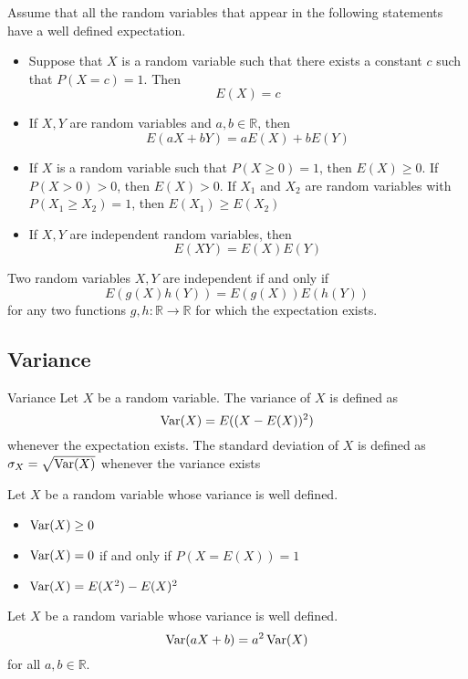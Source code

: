 \documentclass[a4paper]{article}
\begin{document}
\begin{prp}{}{} Assume that all the random variables that appear in the following statements have a well defined expectation. 
\begin{itemize}
\item Suppose that $X$ is a random variable such that there exists a constant $c$ such that $P(X=c)=1$. Then $$E(X)=c$$
\item If $X,Y$ are random variables and $a,b\in\mathbb{R}$, then $$E(aX+bY)=aE(X)+bE(Y)$$
\item If $X$ is a random variable such that $P(X\geq 0)=1$, then $E(X)\geq 0$. If $P(X>0)>0$, then $E(X)>0$. If $X_1$ and $X_2$ are random variables with $P(X_1\geq X_2)=1$, then $E(X_1)\geq E(X_2)$
\item If $X,Y$ are independent random variables, then $$E(XY)=E(X)E(Y)$$
\end{itemize}
\end{prp}

\begin{thm}{}{} Two random variables $X,Y$ are independent if and only if $$E(g(X)h(Y))=E(g(X))E(h(Y))$$ for any two functions $g,h:\mathbb{R}\to\mathbb{R}$ for which the expectation exists. 
\end{thm}

\subsection{Variance}
\begin{defn}{Variance}{} Let $X$ be a random variable. The variance of $X$ is defined as $$\operatorname{Var}(X)=E((X-E(X))^2)$$ whenever the expectation exists. The standard deviation of $X$ is defined as $\sigma_X=\sqrt{\operatorname{Var}(X)}$ whenever the variance exists
\end{defn}

\begin{thm}{}{} Let $X$ be a random variable whose variance is well defined. 
\begin{itemize}
\item $\operatorname{Var}(X)\geq0$
\item $\operatorname{Var}(X)=0$ if and only if $P(X=E(X))=1$
\item $\operatorname{Var}(X)=E(X^2)-E(X)^2$
\end{itemize}
\end{thm}

\begin{prp}{}{} Let $X$ be a random variable whose variance is well defined. $$\operatorname{Var}(aX+b)=a^2\operatorname{Var}(X)$$ for all $a,b\in\mathbb{R}$. 
\end{prp}
\end{document}
